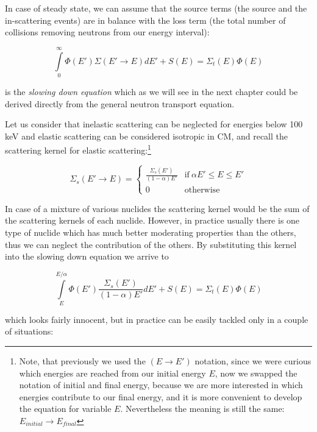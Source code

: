 In case of steady state, we can assume that the source terms (the source and the in-scattering events) are in balance with the loss term (the total number of collisions removing neutrons from our energy interval):

\begin{equation}
\int\limits_0^\infty \Phi(E')\Sigma(E'\rightarrow E)dE'+S(E)=\Sigma_t(E)\Phi(E)
\end{equation}

\noindent is the \textit{slowing down equation} which as we will see in the next chapter could be derived directly from the general neutron transport equation.

Let us consider that inelastic scattering can be neglected for energies below 100 keV and elastic scattering can be considered isotropic in CM, and recall the scattering kernel for elastic scattering:\footnote{Note, that previously we used the $(E\rightarrow E')$ notation, since we were curious which energies are reached from our initial energy $E$, now we swapped the notation of initial and final energy, because we are more interested in which energies contribute to our final energy, and it is more convenient to develop the equation for variable $E$. Nevertheless the meaning is still the same: $E_{initial}\rightarrow E_{final}$}

\begin{equation}\label{eq:scatkernel}
    \Sigma_s(E'\rightarrow E) = 
    \begin{cases}
      \frac{\Sigma_s(E')}{(1-\alpha)E'} & \text{if} \: \alpha E' \leq E \leq E' \\
      0 & \text{otherwise}
    \end{cases}
\end{equation}

\noindent In case of a mixture of various nuclides the scattering kernel would be the sum of the scattering kernels of each nuclide. However, in practice usually there is one type of nuclide which has much better moderating properties than the others, thus we can neglect the contribution of the others. By substituting this kernel into the slowing down equation we arrive to

\begin{equation}\label{eq:slowingdown}
\int\limits_E^{E/\alpha} \Phi(E')\frac{\Sigma_s(E')}{(1-\alpha)E'}dE'+S(E)=\Sigma_t(E)\Phi(E)
\end{equation}

\noindent which looks fairly innocent, but in practice can be easily tackled only in a couple of situations:

